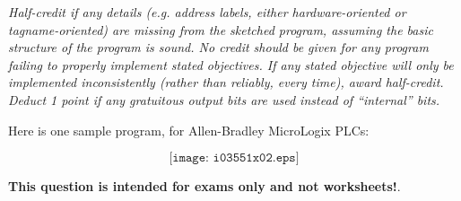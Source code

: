
{\it Half-credit if any details (e.g. address labels, either hardware-oriented or tagname-oriented) are missing from the sketched program, assuming the basic structure of the program is sound.  No credit should be given for any program failing to properly implement  stated objectives.  If any stated objective will only be implemented inconsistently (rather than reliably, every time), award half-credit.  Deduct 1 point if any gratuitous output bits are used instead of ``internal'' bits.}

\vskip 10pt

Here is one sample program, for Allen-Bradley MicroLogix PLCs:

$$\texttt{[image: i03551x02.eps]}$$







{\bf This question is intended for exams only and not worksheets!}.


